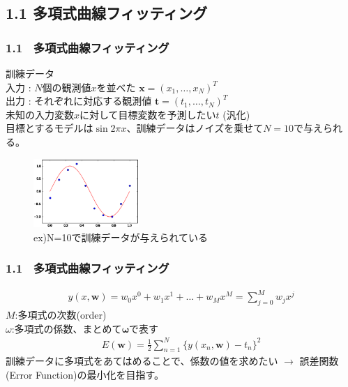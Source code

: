 \documentclass[dvipdfmx]{beamer}
\theoremstyle{definition}
\begin{document}
\subsection{1.1 多項式曲線フィッティング}
\begin{frame}
  \frametitle{1.1 \ 多項式曲線フィッティング}
  訓練データ \\
  入力 : $N$個の観測値$x$を並べた $\bm{x} = (x_1, \dots, x_N)^T$ \\
  出力 : それぞれに対応する観測値 $\bm{t} = (t_1, \dots, t_N)^T$ \\
 
  未知の入力変数$x$に対して目標変数を予測したい$t$ (汎化)\\
  
  目標とするモデルは$\sin{2 \pi x}$、訓練データはノイズを乗せて$N=10$で与えられる。
  \begin{figure}[htb]
    \centering
    \includegraphics[width=4.0cm,clip]{res/fitting.eps}
    \caption{ex)N=10で訓練データが与えられている}
  \end{figure}
  
\end{frame}

\begin{frame}
  \frametitle{1.1 \ 多項式曲線フィッティング}
  \begin{gather*}
    y(x,\bm{w}) = w_0 x^0 + w_1 x^1 + \dots + w_M x^{M} = \sum_{j=0}^{M} w_j x^j
  \end{gather*}
  $M$:多項式の次数(order) \\
  $\omega$:多項式の係数、まとめて$\bm{\omega}$で表す \\
  \begin{gather*}
    E(\bm{w}) = \frac{1}{2} \sum_{n=1}^{N} \{ y(x_n,\bm{w})- t_n \}^2
  \end{gather*}
  訓練データに多項式をあてはめることで、係数の値を求めたい $\to$ 誤差関数(Error Function)の最小化を目指す。
\end{frame}
\end{document}
